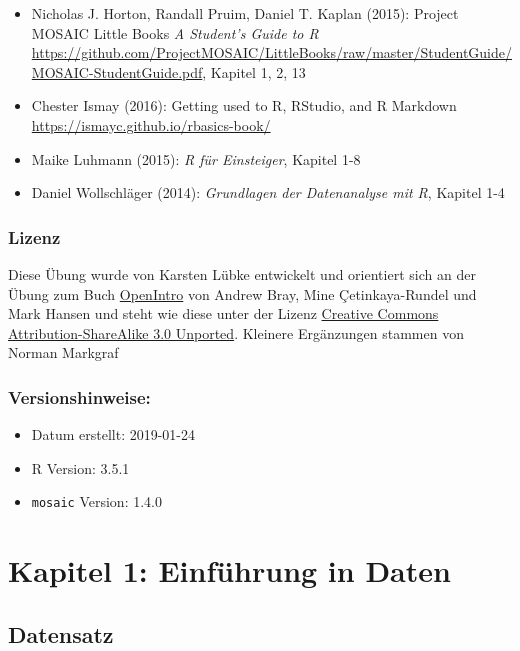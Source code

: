 \documentclass[12pt,ngerman,paper=a4,pagesize,DIV=13]{scrreprt}
\providecommand{\tightlist}{%
  \setlength{\itemsep}{0pt}\setlength{\parskip}{0pt}}
\begin{document}
\begin{itemize}
\tightlist
\item
  Nicholas J. Horton, Randall Pruim, Daniel T. Kaplan (2015): Project
  MOSAIC Little Books \emph{A Student's Guide to R}
  \url{https://github.com/ProjectMOSAIC/LittleBooks/raw/master/StudentGuide/MOSAIC-StudentGuide.pdf},
  Kapitel 1, 2, 13
\item
  Chester Ismay (2016): Getting used to R, RStudio, and R Markdown
  \url{https://ismayc.github.io/rbasics-book/}
\item
  Maike Luhmann (2015): \emph{R für Einsteiger}, Kapitel 1-8
\item
  Daniel Wollschläger (2014): \emph{Grundlagen der Datenanalyse mit R},
  Kapitel 1-4
\end{itemize}

\hypertarget{lizenz}{%
\subsection{Lizenz}\label{lizenz}}

Diese Übung wurde von Karsten Lübke entwickelt und orientiert sich an
der Übung zum Buch
\href{https://www.openintro.org/stat/index.php?stat_book=isrs}{OpenIntro}
von Andrew Bray, Mine Çetinkaya-Rundel und Mark Hansen und steht wie
diese unter der Lizenz
\href{http://creativecommons.org/licenses/by-sa/3.0}{Creative Commons
Attribution-ShareAlike 3.0 Unported}. Kleinere Ergänzungen stammen von
Norman Markgraf

\hypertarget{versionshinweise}{%
\subsection{Versionshinweise:}\label{versionshinweise}}

\begin{itemize}
\tightlist
\item
  Datum erstellt: 2019-01-24
\item
  R Version: 3.5.1
\item
  \texttt{mosaic} Version: 1.4.0
\end{itemize}

\hypertarget{kapitel-1-einfuhrung-in-daten}{%
\chapter{Kapitel 1: Einführung in
Daten}\label{kapitel-1-einfuhrung-in-daten}}

\hypertarget{datensatz}{%
\section{Datensatz}\label{datensatz}}
\end{document}
